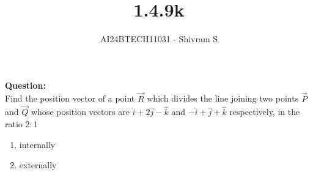 \documentclass[journal]{IEEEtran}
\begin{document}

\vspace{3cm}

\title{1.4.9k}
\author{AI24BTECH11031 - Shivram S
}
{\let\newpage\relax\maketitle}

\renewcommand{\thefigure}{\theenumi}
\renewcommand{\thetable}{\theenumi}
\setlength{\intextsep}{10pt} %


\renewcommand{\thetable}{\theenumi}


\textbf{Question: }\\
Find the position vector of a point $\vec R$ which divides the line joining two points $\vec P$ and $\vec Q$ whose position vectors are $\hat{i} + 2 \hat{j} - \hat{k}$ and $-\hat{i} + \hat{j} + \hat{k}$ respectively, in the ratio $2:1$

\begin{enumerate}
	\item internally
	\item externally
\end{enumerate}
\end{document}
